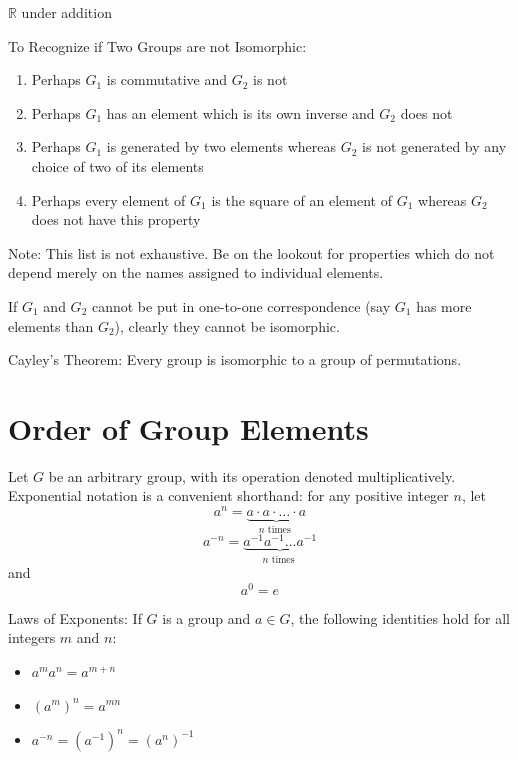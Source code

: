 \documentclass[12pt]{article}
\newcommand{\inverse}[1]{#1 ^{-1}}
\newcommand{\pinverse}[1]{(#1)^{-1}}
\newcommand{\reals}{\mathds{R}}
\begin{document}
\begin{example} $\reals$ under addition \end{example} 

To Recognize if Two Groups are not Isomorphic: \begin{enumerate} 
\item Perhaps $G_1$ is commutative and $G_2$ is not 
\item Perhaps $G_1$ has an element which is its own inverse and $G_2$ does not 
\item Perhaps $G_1$ is generated by two elements whereas $G_2$ is not generated by any choice of two of its elements 
\item Perhaps every element of $G_1$ is the square of an element of $G_1$ whereas $G_2$ does not have this property \end{enumerate} 
Note: This list is not exhaustive. Be on the lookout for properties which do not depend merely on the names assigned to individual elements. 

\begin{definition} If $G_1$ and $G_2$ cannot be put in one-to-one correspondence (say $G_1$ has more elements than $G_2$), clearly they cannot be isomorphic. \end{definition} 

\begin{theorem} Cayley's Theorem: Every group is isomorphic to a group of permutations. \end{theorem} 

\section{Order of Group Elements}

\begin{definition} Let $G$ be an arbitrary group, with its operation denoted multiplicatively. Exponential notation is a convenient shorthand: for any positive integer $n$, let $$a^n = \underbrace{a \cdot a \cdot \dots \cdot a}_{n \text{ times }}$$ $$a^{-n} = \underbrace{\inverse{a} \inverse{a} \dots \inverse{a}}_{n \text{ times }} $$ and $$a^0 = e$$ \end{definition} 

\begin{theorem} Laws of Exponents: If $G$ is a group and $a \in G$, the following identities hold for all integers $m$ and $n$: 
\begin{itemize} 
\item $a^ma^n = a^{m + n}$
\item $(a^m)^n = a^{mn}$
\item $a^{-n} = (a^{-1})^n = \pinverse{a^n}$ \end{itemize} \end{theorem} 
\end{document}
